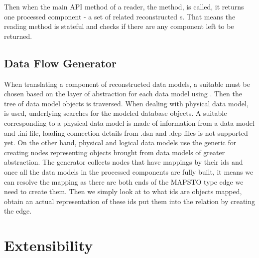 Then when the main API method of a reader, the  method, is called, it returns one processed component - a set of related reconstructed s. 
That means the reading method is stateful and  checks if there are any component left to be returned.

\subsection{Data Flow Generator}

When translating a component of reconstructed data models, a suitable  must be chosen based on the layer of abstraction for each data model using .
Then the tree of data model objects is traversed. When dealing with physical data model,  is used, underlying  searches for the modeled database objects. A suitable  corresponding to a physical data model is made of information from a data model and .ini file, loading connection details from .dsn and .dcp files is not supported yet.
On the other hand, physical and logical data models use the generic  for creating nodes representing objects brought from data models of greater abstraction.
The generator collects nodes that have mappings by their ids and once all the data models in the processed components are fully built, it means we can resolve the mapping as there are both ends of the MAPS\textunderscore TO type edge we need to create them. Then we simply look at to what ids are objects mapped, obtain an actual representation of these ids put them into the relation by creating the edge.

\section{Extensibility}

